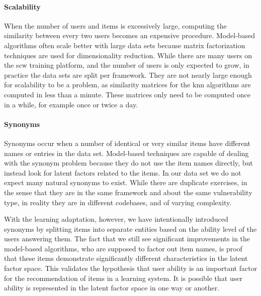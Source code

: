 \paragraph{Scalability}
When the number of users and items is excessively large, computing the similarity between every two users becomes an expensive procedure.
Model-based algorithms often scale better with large data sets because matrix factorization techniques are used for dimensionality reduction.
While there are many users on the \gls{scw} training platform, and the number of users is only expected to grow, in practice the data sets are split per framework.
They are not nearly large enough for scalability to be a problem, as similarity matrices for the \gls{knn} algorithms are computed in less than a minute.
These matrices only need to be computed once in a while, for example once or twice a day.

\paragraph{Synonyms}
Synonyms occur when a number of identical or very similar items have different names or entries in the data set.
Model-based techniques are capable of dealing with the synonym problem because they do not use the item names directly, but instead look for latent factors related to the items.
In our data set we do not expect many natural synonyms to exist.
While there are duplicate exercises, in the sense that they are in the same framework and about the same vulnerability type, in reality they are in different codebases, and of varying complexity.

With the learning adaptation, however, we have intentionally introduced synonyms by splitting items into separate entities based on the ability level of the users answering them.
The fact that we still see significant improvements in the model-based algorithms, who are supposed to factor out item names, is proof that these items demonstrate significantly different characteristics in the latent factor space.
This validates the hypothesis that user ability is an important factor for the recommendation of items in a learning system.
It is possible that user ability is represented in the latent factor space in one way or another.

